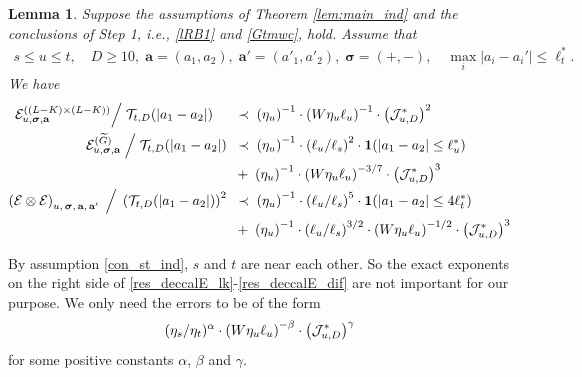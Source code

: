 \documentclass[10pt,reqno]{article}
\theoremstyle{plain} %
\newtheorem{lemma}[theorem]{Lemma}
\theoremstyle{remark}
\numberwithin{equation}{section}
\begin{document}
\begin{lemma}\label{lem_dec_calE}  Suppose  the assumptions of Theorem  \ref{lem:main_ind} and the conclusions  of Step 1, i.e., \eqref{lRB1} and \eqref{Gtmwc}, 
hold. Assume that 
\begin{align} 
s\le u\le t, \quad  D\ge 10, \; \textbf{a}=(a_1,a_2),\; \textbf{a}'=(a'_1,a'_2),\; \boldsymbol{\sigma}=(+,-), \quad 
\max_i |a_i-a_i'|\le \ell_t ^*. \label{57}
\end{align}
 We  have 
\begin{align}\label{res_deccalE_lk}
       {\cal E}^{( (L-K)\times(L-K) )}
       _{u, \boldsymbol{\sigma},\textbf{a}} \Big/\; 
  {\cal T}_{t,D}(|a_1-a_2|) \quad 
 \;  &\; \prec \; 
   \left(\eta_u\right)^{-1} 
   \cdot  
   \left(W\eta_u\ell_u\right)^{-1}
    \cdot 
 \left({\cal J}^{*}_{u,D} \right)^{2}
 \\
      \mathcal{E}^{( \widetilde{G} )}_{u, \boldsymbol{\sigma},\textbf{a}} 
    \;\Big/\; 
 {\cal T}_{t,D}(|a_1-a_2|)
 \;  &\; \prec \; 
 \left(\eta_u\right)^{-1} 
  \cdot \left(\ell_u/\ell_s\right)^2\cdot{\bf 1}(|a_1-a_2|\le \ell_u^*)
    \nonumber  \\
       \;  &\; + \;  \left(\eta_u\right)^{-1} 
  \cdot
       \left(W \eta_u \ell_u\right)^{-3/7}  \cdot 
       \left({\cal J}^{*}_{u,D} \right)^{3}
 \label{res_deccalE_wG}\\
\label{res_deccalE_dif}
    \left(
   \mathcal{E}\otimes  \mathcal{E} \right)
   _{u, \,\boldsymbol{\sigma},  \,{\textbf a} ,\, {\textbf a}'
     }
     \;\Big/\; 
 \left( {\cal T}_{t,D}(|a_1-a_2|)\right)^2
 \;  &\; \prec \; 
  \left(\eta_u\right)^{-1} 
  \cdot \left(\ell_u/\ell_s\right)^5\cdot{\bf 1}(|a_1-a_2|\le 4\ell_t^*)
     \nonumber \\
       \;  &\; + \;  \left(\eta_u\right)^{-1} \cdot \left(\ell_u/\ell_s\right)^{3/2} 
  \cdot
       \left(W \eta_u \ell_u\right)^{-1/2}  \cdot 
    \left({\cal J}^{*}_{u,D} \right)^{3}
\end{align} 
  \end{lemma}
By assumption  \eqref{con_st_ind},  $s$ and $t$ are near each other.  So the exact exponents  on the right side  of \eqref{res_deccalE_lk}-\eqref{res_deccalE_dif} are not important for our purpose.  We only need the errors to be of the form 
$$
  (\eta_s/\eta_t)^\alpha\cdot \left(W \eta_u \ell_u\right)^{-\beta}\cdot \left({\cal J}^{*}_{u,D} \right) ^{\gamma}
  $$
for some positive constants $\alpha$, $\beta$ and $\gamma$. 
\end{document}
